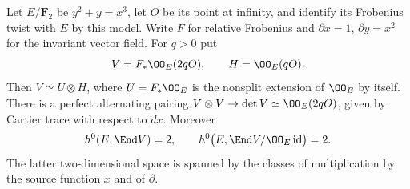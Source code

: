 \begin{lemma}
\label{lem:DE-A3-ss-Frobenius-endomorphisms}
Let $E/\mathbf F_2$ be $y^2+y=x^3$, let $O$ be its point at infinity,
and identify its Frobenius twist with $E$ by this model.  Write $F$ for
relative Frobenius and $\partial x=1$, $\partial y=x^2$ for the invariant
vector field.  For $q>0$ put
\[
 V=F_*\OO_E(2qO),\qquad H=\OO_E(qO).
\]
Then $V\simeq U\otimes H$, where $U=F_*\OO_E$ is the nonsplit extension
of $\OO_E$ by itself.  There is a perfect alternating pairing
$V\otimes V\to\det V\simeq\OO_E(2qO)$, given by Cartier trace with
respect to $dx$.  Moreover
\[
 h^0(E,\End V)=2,\qquad
 h^0\bigl(E,\End V/\OO_E\operatorname{id}\bigr)=2.
\]
The latter two-dimensional space is spanned by the classes of
multiplication by the source function $x$ and of $\partial$.
\end{lemma}
